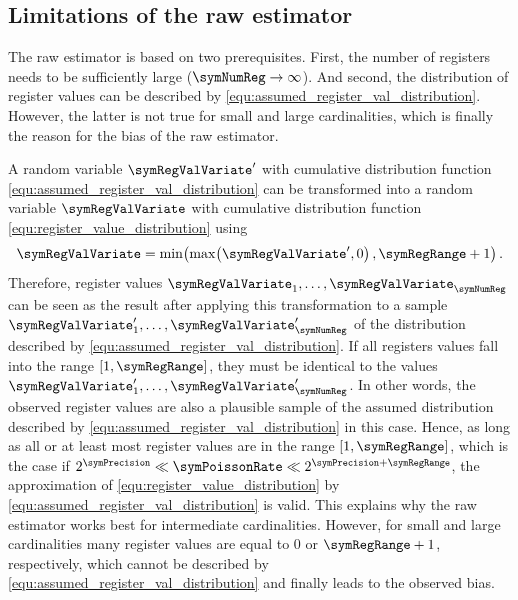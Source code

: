 \documentclass[a4paper]{scrartcl}
\begin{document}
\subsection{Limitations of the raw estimator}
The raw estimator is based on two prerequisites. First, the number of registers needs to be sufficiently large ($\symNumReg\rightarrow\infty$). And second, the distribution of register values can be described by \eqref{equ:assumed_register_val_distribution}. However, the latter is not true for small and large cardinalities, which is finally the reason for the bias of the raw estimator.

A random variable $\symRegValVariate'$ with cumulative distribution function \eqref{equ:assumed_register_val_distribution} can be transformed into a random variable $\symRegValVariate$ with cumulative distribution function \eqref{equ:register_value_distribution} using
\begin{equation}
\label{equ:dist_transformation}
\symRegValVariate = \min\!\left(\max\!\left(\symRegValVariate',0\right), \symRegRange+1\right).
\end{equation}
Therefore, register values $\symRegValVariate_1,\ldots,\symRegValVariate_\symNumReg$ can be seen as the result after applying this transformation to a sample $\symRegValVariate'_1,\ldots,\symRegValVariate'_\symNumReg$ of the distribution described by \eqref{equ:assumed_register_val_distribution}. If all registers values fall into the range $[1,\symRegRange]$, they must  be identical to the values $\symRegValVariate'_1,\ldots,\symRegValVariate'_\symNumReg$. In other words, the observed register values are also a plausible sample of the assumed distribution described by \eqref{equ:assumed_register_val_distribution} in this case. Hence, as long as all or at least most register values are in the range $[1,\symRegRange]$, which is the case if $2^\symPrecision \ll \symPoissonRate \ll 2^{\symPrecision
+\symRegRange}$, the approximation of \eqref{equ:register_value_distribution} by \eqref{equ:assumed_register_val_distribution} is valid. This explains why the raw estimator works best for intermediate cardinalities. However, for small and large cardinalities many register values are equal to 0 or $\symRegRange+1$, respectively, which cannot be described by \eqref{equ:assumed_register_val_distribution} and finally leads to the observed bias.
\end{document}
